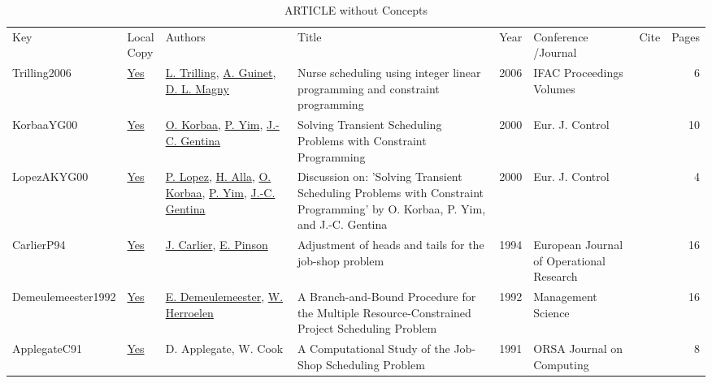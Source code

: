 {\scriptsize
\begin{longtable}{llp{5cm}p{10cm}rp{3cm}lr}
\rowcolor{white}\caption{ARTICLE without Concepts}\\ \toprule
\rowcolor{white}Key & \shortstack{Local\\Copy} & Authors & Title & Year & \shortstack{Conference\\/Journal} & Cite & Pages\\ \midrule
\endhead
\bottomrule
\endfoot
Trilling2006 & \href{../scheduling/works/Trilling2006.pdf}{Yes} & \hyperref[auth:a1654]{L. Trilling}, \hyperref[auth:a1655]{A. Guinet}, \hyperref[auth:a1656]{D. L. Magny} & Nurse scheduling using integer linear programming and constraint programming & 2006 & IFAC Proceedings Volumes & \cite{Trilling2006} & 6\\KorbaaYG00 & \href{../scheduling/works/KorbaaYG00.pdf}{Yes} & \hyperref[auth:a679]{O. Korbaa}, \hyperref[auth:a680]{P. Yim}, \hyperref[auth:a681]{J.-C. Gentina} & Solving Transient Scheduling Problems with Constraint Programming & 2000 & Eur. J. Control & \cite{KorbaaYG00} & 10\\LopezAKYG00 & \href{../scheduling/works/LopezAKYG00.pdf}{Yes} & \hyperref[auth:a3]{P. Lopez}, \hyperref[auth:a682]{H. Alla}, \hyperref[auth:a679]{O. Korbaa}, \hyperref[auth:a680]{P. Yim}, \hyperref[auth:a681]{J.-C. Gentina} & Discussion on: 'Solving Transient Scheduling Problems with Constraint Programming' by O. Korbaa, P. Yim, and {J.-C.} Gentina & 2000 & Eur. J. Control & \cite{LopezAKYG00} & 4\\CarlierP94 & \href{../scheduling/works/CarlierP94.pdf}{Yes} & \hyperref[auth:a844]{J. Carlier}, \hyperref[auth:a845]{E. Pinson} & Adjustment of heads and tails for the job-shop problem & 1994 & European Journal of Operational Research & \cite{CarlierP94} & 16\\Demeulemeester1992 & \href{../scheduling/works/Demeulemeester1992.pdf}{Yes} & \hyperref[auth:a1089]{E. Demeulemeester}, \hyperref[auth:a1101]{W. Herroelen} & A Branch-and-Bound Procedure for the Multiple Resource-Constrained Project Scheduling Problem & 1992 & Management Science & \cite{Demeulemeester1992} & 16\\ApplegateC91 & \href{../scheduling/works/ApplegateC91.pdf}{Yes} & D. Applegate, W. Cook & A Computational Study of the Job-Shop Scheduling Problem & 1991 & ORSA Journal on Computing & \cite{ApplegateC91} & 8\\\end{longtable}
}

